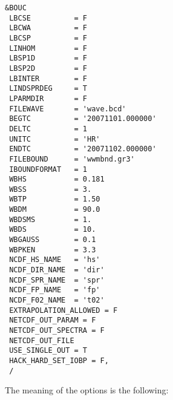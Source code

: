 \documentclass[12pt]{amsart}
\begin{document}
\begin{verbatim}
&BOUC
 LBCSE          = F  
 LBCWA          = F  
 LBCSP          = F  
 LINHOM         = F  
 LBSP1D         = F   
 LBSP2D         = F   
 LBINTER        = F   
 LINDSPRDEG     = T   
 LPARMDIR       = F   
 FILEWAVE       = 'wave.bcd'        
 BEGTC          = '20071101.000000' 
 DELTC          = 1                 
 UNITC          = 'HR'              
 ENDTC          = '20071102.000000'
 FILEBOUND      = 'wwmbnd.gr3'  
 IBOUNDFORMAT   = 1     
 WBHS           = 0.181         
 WBSS           = 3.            
 WBTP           = 1.50         
 WBDM           = 90.0         
 WBDSMS         = 1.           
 WBDS           = 10.          
 WBGAUSS        = 0.1          
 WBPKEN         = 3.3        
 NCDF_HS_NAME   = 'hs'       
 NCDF_DIR_NAME  = 'dir'      
 NCDF_SPR_NAME  = 'spr'      
 NCDF_FP_NAME   = 'fp'       
 NCDF_F02_NAME  = 't02'      
 EXTRAPOLATION_ALLOWED = F
 NETCDF_OUT_PARAM = F   
 NETCDF_OUT_SPECTRA = F 
 NETCDF_OUT_FILE        
 USE_SINGLE_OUT = T  
 HACK_HARD_SET_IOBP = F,
 /
\end{verbatim}
The meaning of the options is the following:
\end{document}
